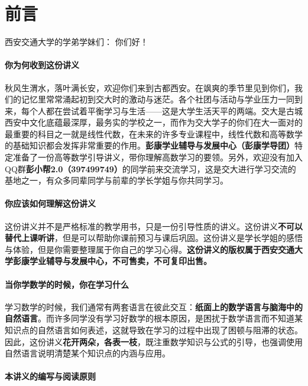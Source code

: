 \chapter*{前言}


西安交通大学的学弟学妹们： 你们好！

\subsubsection*{你为何收到这份讲义}
秋风生渭水，落叶满长安，欢迎你们来到古都西安。在飒爽的季节里见到你们，我们的记忆里常常涌起初到交大时的激动与迷茫。各个社团与活动与学业压力一同到来，每个人都在尝试着平衡学习与生活——这是大学生活天平的两端。交大是古城西安中文化底蕴最深厚，最务实的学校之一，而作为交大学子的你们在大一面对的最重要的科目之一就是线性代数，在未来的许多专业课程中，线性代数和高等数学的基础知识都会发挥非常重要的作用。\textbf{彭康学业辅导与发展中心（彭康学导团）}特定准备了一份高等数学引导讲义，带你理解高数学习的要领。另外，欢迎没有加入QQ群\textbf{彭小帮2.0（397499749）}的同学前来交流学习，这是交大进行学习交流的基地之一，有众多同辈同学与前辈的学长学姐与你共同学习。

\subsubsection*{你应该如何理解这份讲义}
这份讲义并不是严格标准的教学用书，只是一份引导性质的讲义。这份讲义\textbf{不可以替代上课听讲}，但是可以帮助你课前预习与课后巩固。这份讲义是学长学姐的感悟与体验，但是你需要整理属于你自己的学习心得。\textbf{这份讲义的版权属于西安交通大学彭康学业辅导与发展中心，不可售卖，不可复印出售。}

\subsubsection*{当你学数学的时候，你在学习什么}
学习数学的时候，我们通常有两套语言在彼此交互：\textbf{纸面上的数学语言与脑海中的自然语言}。而许多同学没有学习好数学的根本原因，是困扰于数学语言而不知道某知识点的自然语言如何表述，这就导致在学习的过程中出现了困顿与阻滞的状态。因此，这份讲义\textbf{花开两朵，各表一枝}，既注重数学知识与公式的引导，也强调使用自然语言说明清楚某个知识点的内涵与应用。

\subsubsection{本讲义的编写与阅读原则}

